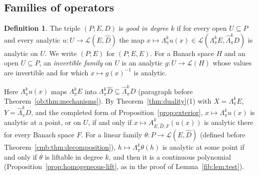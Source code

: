\documentclass[11pt]{amsart}
\theoremstyle{definition}
\newtheorem{definition}[theorem]{Definition}
\theoremstyle{remark}
\numberwithin{equation}{section}
\newcommand{\cL}{\mathcal L}
\theoremstyle{plain}
\theoremstyle{definition}
\theoremstyle{plain}
\newcommand{\hLambda}{\widehat\Lambda}
\begin{document}
\subsection{Families of operators}\label{fam2:ssec:framework}

\begin{definition}\label{fam2:def:good}
The triple $(P;E,D)$ is \emph{good in degree $k$} if for every open $U\subseteq P$ and every analytic
$u\colon U\to\cL(E,\widehat D)$ the map $x\mapsto\Lambda^k_\pi u(x)\in\cL(\Lambda^k_\pi E,\hLambda^k_\pi D)$ is analytic on
$U$. We write $(P;E)$ for $(P;E,E)$. For a Banach space $H$ and an open $U\subseteq P$, an \emph{invertible family} on $U$
is an analytic $g\colon U\to\cL(H)$ whose values are invertible and for which $x\mapsto g(x)^{-1}$ is analytic.
\end{definition}

Here $\Lambda^k_\pi u(x)$ maps $\Lambda^k_\pi E$ into $\Lambda^k_\pi\widehat D\subseteq\hLambda^k_\pi D$ (paragraph before
Theorem~\ref{ob:thm:mechanisms}). By Theorem~\ref{thm:duality}(1) with $X=\Lambda^k_\pi E$, $Y=\hLambda^k_\pi D$, and the
completed form of Proposition~\ref{prop:exterior}, $x\mapsto\Lambda^k_\pi u(x)$ is analytic at a point, or on $U$, if and
only if $x\mapsto A^k_{E,\widehat D;F}(u(x))$ is analytic there for every Banach space $F$. For a linear family
$\theta\colon P\to\cL(E,\widehat D)$ (defined before Theorem~\ref{cmb:thm:decomposition}), $h\mapsto\Lambda^k_\pi\theta(h)$ is analytic at some
point if and only if $\theta$ is liftable in degree $k$, and then it is a continuous polynomial
(Proposition~\ref{prop:homogeneous-lift}, as in the proof of Lemma~\ref{fib:lem:test}).
\end{document}
